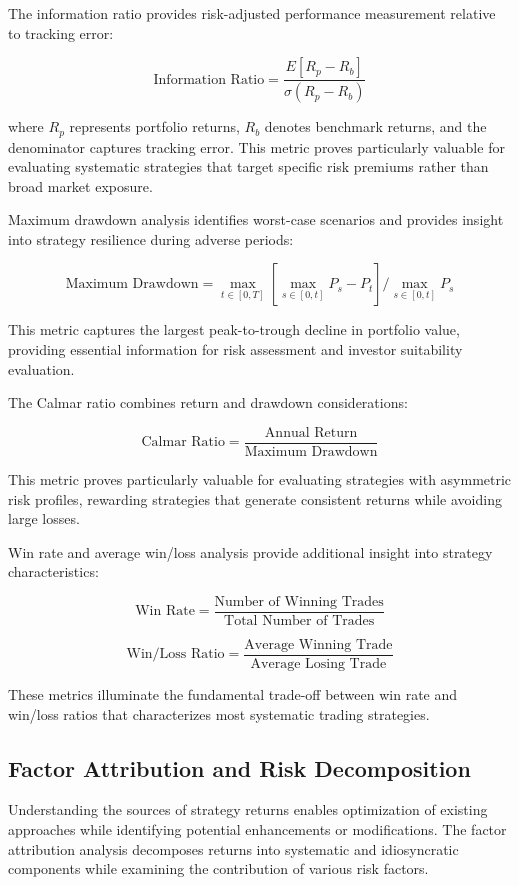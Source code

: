 \documentclass[
  american,
  11pt,
  11pt,
  letterpaper,
  onecolumn]{article}
\begin{document}
The information ratio provides risk-adjusted performance measurement
relative to tracking error:

\[\text{Information Ratio} = \frac{E[R_p - R_b]}{\sigma(R_p - R_b)}\]

where \(R_p\) represents portfolio returns, \(R_b\) denotes benchmark
returns, and the denominator captures tracking error. This metric proves
particularly valuable for evaluating systematic strategies that target
specific risk premiums rather than broad market exposure.

Maximum drawdown analysis identifies worst-case scenarios and provides
insight into strategy resilience during adverse periods:

\[\text{Maximum Drawdown} = \max_{t \in [0,T]} \left[\max_{s \in [0,t]} P_s - P_t\right] / \max_{s \in [0,t]} P_s\]

This metric captures the largest peak-to-trough decline in portfolio
value, providing essential information for risk assessment and investor
suitability evaluation.

The Calmar ratio combines return and drawdown considerations:

\[\text{Calmar Ratio} = \frac{\text{Annual Return}}{\text{Maximum Drawdown}}\]

This metric proves particularly valuable for evaluating strategies with
asymmetric risk profiles, rewarding strategies that generate consistent
returns while avoiding large losses.

Win rate and average win/loss analysis provide additional insight into
strategy characteristics:

\[\text{Win Rate} = \frac{\text{Number of Winning Trades}}{\text{Total Number of Trades}}\]

\[\text{Win/Loss Ratio} = \frac{\text{Average Winning Trade}}{\text{Average Losing Trade}}\]

These metrics illuminate the fundamental trade-off between win rate and
win/loss ratios that characterizes most systematic trading strategies.

\subsection{Factor Attribution and Risk
Decomposition}\label{factor-attribution-and-risk-decomposition}

Understanding the sources of strategy returns enables optimization of
existing approaches while identifying potential enhancements or
modifications. The factor attribution analysis decomposes returns into
systematic and idiosyncratic components while examining the contribution
of various risk factors.
\end{document}
